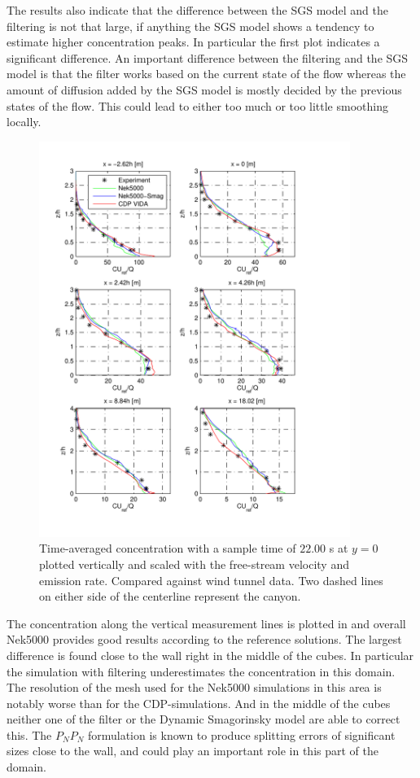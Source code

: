 The results also indicate that the difference between the SGS model and the filtering
is not that large,
if anything the SGS model shows a tendency to estimate higher concentration peaks.
In particular the first plot indicates a significant difference.
An important difference between the filtering and the SGS model is 
that the filter works based on the current state of the flow 
whereas the amount of diffusion added by the SGS model is mostly decided
by the previous states of the flow.
This could lead to either too much or too little smoothing locally.

\newpage
\begin{figure}[h]
    \centering
    \includegraphics[width=0.9\textwidth]{Figures/NekcV_all.pdf}
    \caption{Time-averaged concentration with a sample time of $22.00$ s at $y = 0$ plotted
    vertically and scaled 
    with the free-stream velocity and emission rate. Compared against wind tunnel data.
Two dashed lines on either side of the centerline represent the canyon.}
    \label{fig:cVall}
\end{figure}
The concentration along the vertical measurement lines is plotted in  and overall 
Nek5000 provides good results according to the reference solutions. The largest difference is found close 
to the wall right in the middle of the cubes. In particular the simulation with filtering 
underestimates the concentration in this domain. The resolution of the mesh used for the 
Nek5000 simulations in this area is notably worse than for the CDP-simulations.
And in the middle of the cubes neither one of the filter or the Dynamic Smagorinsky model
are able to correct this.
The $P_NP_N$ formulation is known to produce splitting errors of significant sizes 
close to the wall, and could play an important role in this part of the domain.

